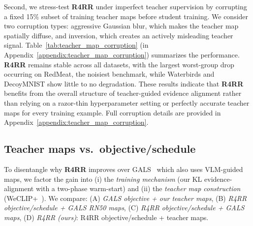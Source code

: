 Second, we stress-test \textbf{R4RR} under imperfect teacher supervision by corrupting a fixed 15\% subset of training teacher maps before student training. We consider two corruption types: aggressive Gaussian blur, which makes the teacher map spatially diffuse, and inversion, which creates an actively misleading teacher signal. 
Table~\ref{tab:teacher_map_corruption} (in Appendix~\ref{appendix:teacher_map_corruption}) summarizes the performance. \textbf{R4RR} remains stable across all datasets, with the largest worst-group drop occurring on RedMeat, the noisiest benchmark, while Waterbirds and DecoyMNIST show little to no degradation. These results indicate that \textbf{R4RR} benefits from the overall structure of teacher-guided evidence alignment rather than relying on a razor-thin hyperparameter setting or perfectly accurate teacher maps for every training example. Full corruption details are provided in Appendix~\ref{appendix:teacher_map_corruption}.



\subsection{Teacher maps vs.\ objective/schedule}
\label{sec:ablation_gals_vs_r4rr}
To disentangle why \textbf{R4RR} improves over GALS~\cite{petryk2022guiding} which also uses VLM-guided maps, we factor the gain into (i) the \emph{training mechanism} (our KL evidence-alignment with a two-phase warm-start) and (ii) the \emph{teacher map construction} (WeCLIP+~\cite{zhang2024frozen}). We compare: (A) \emph{GALS objective + our teacher maps}, (B) \emph{R4RR objective/schedule + GALS RN50 maps}, (C) \emph{R4RR objective/schedule + GALS maps}, (D) \emph{R4RR (ours)}: R4RR objective/schedule + teacher maps.

